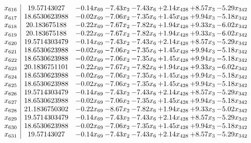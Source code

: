 \documentclass[8pt]{article}
\begin{document}
\[\begin{array}{c| c c@{\hskip 2pt} c@{\hskip 2pt} c@{\hskip 2pt} c@{\hskip 2pt} c@{\hskip 2pt} c@{\hskip 2pt} }
 x_{616}   &  19.57143027 & -0.14 x_{69} & -7.43 x_{2} & -7.43 x_{6} & +  2.14 x_{428} & +  8.57 x_{3} & -5.29 x_{342}\\
 x_{617}   &  18.6530623988 & -0.02 x_{69} & -7.06 x_{2} & -7.35 x_{6} & +  1.45 x_{428} & +  9.94 x_{3} & -5.18 x_{342}\\
 x_{618}   &  20.183675188 & -0.22 x_{69} & -7.67 x_{2} & -7.82 x_{6} & +  1.94 x_{428} & +  9.33 x_{3} & -6.02 x_{342}\\
 x_{619}   &  20.183675188 & -0.22 x_{69} & -7.67 x_{2} & -7.82 x_{6} & +  1.94 x_{428} & +  9.33 x_{3} & -6.02 x_{342}\\
 x_{620}   &  19.5714303479 & -0.14 x_{69} & -7.43 x_{2} & -7.43 x_{6} & +  2.14 x_{428} & +  8.57 x_{3} & -5.29 x_{342}\\
 x_{621}   &  18.6530623988 & -0.02 x_{69} & -7.06 x_{2} & -7.35 x_{6} & +  1.45 x_{428} & +  9.94 x_{3} & -5.18 x_{342}\\
 x_{622}   &  18.6530623988 & -0.02 x_{69} & -7.06 x_{2} & -7.35 x_{6} & +  1.45 x_{428} & +  9.94 x_{3} & -5.18 x_{342}\\
 x_{623}   &  20.1836751101 & -0.22 x_{69} & -7.67 x_{2} & -7.82 x_{6} & +  1.94 x_{428} & +  9.33 x_{3} & -6.02 x_{342}\\
 x_{624}   &  18.6530623988 & -0.02 x_{69} & -7.06 x_{2} & -7.35 x_{6} & +  1.45 x_{428} & +  9.94 x_{3} & -5.18 x_{342}\\
 x_{625}   &  18.6530623988 & -0.02 x_{69} & -7.06 x_{2} & -7.35 x_{6} & +  1.45 x_{428} & +  9.94 x_{3} & -5.18 x_{342}\\
 x_{626}   &  19.5714303479 & -0.14 x_{69} & -7.43 x_{2} & -7.43 x_{6} & +  2.14 x_{428} & +  8.57 x_{3} & -5.29 x_{342}\\
 x_{627}   &  18.6530623988 & -0.02 x_{69} & -7.06 x_{2} & -7.35 x_{6} & +  1.45 x_{428} & +  9.94 x_{3} & -5.18 x_{342}\\
 x_{628}   &  21.1836750302 & -0.22 x_{69} & -8.67 x_{2} & -7.82 x_{6} & +  1.94 x_{428} & +  9.33 x_{3} & -5.02 x_{342}\\
 x_{629}   &  19.5714303479 & -0.14 x_{69} & -7.43 x_{2} & -7.43 x_{6} & +  2.14 x_{428} & +  8.57 x_{3} & -5.29 x_{342}\\
 x_{630}   &  18.6530623988 & -0.02 x_{69} & -7.06 x_{2} & -7.35 x_{6} & +  1.45 x_{428} & +  9.94 x_{3} & -5.18 x_{342}\\
 x_{631}   &  19.57143027 & -0.14 x_{69} & -7.43 x_{2} & -7.43 x_{6} & +  2.14 x_{428} & +  8.57 x_{3} & -5.29 x_{342}\\

\end{array}\]
\end{document}
